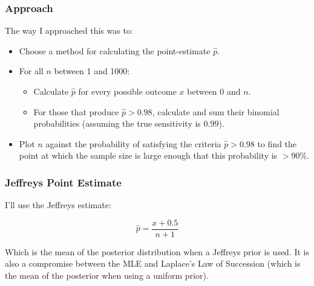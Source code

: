 \documentclass{beamer}\usepackage{knitr}
\begin{document}
\begin{frame}
\frametitle{Approach}

The way I approached this was to:
\begin{itemize}
  \item Choose a method for calculating the point-estimate $\hat{p}$. 
  \item For all $n$ between 1 and 1000:
  \begin{itemize}
    \item Calculate $\hat{p}$ for every possible outcome $x$ between $0$ and $n$.
    \item For those that produce $\hat{p} > 0.98$, calculate and sum their binomial probabilities (assuming the true sensitivity is $0.99$).
  \end{itemize}
  \item Plot $n$ against the probability of satisfying the criteria $\hat{p} > 0.98$ to find the point at which the sample size is large enough that this probability is $> 90\%$. 
\end{itemize}

\end{frame}

\begin{frame}
\frametitle{Jeffreys Point Estimate}
I'll use the Jeffreys estimate:

\begin{equation*}
  \hat{p} = \frac{x + 0.5}{n + 1}
\end{equation*}

Which is the mean of the posterior distribution when a Jeffreys prior is used. It is also a compromise between the MLE and Laplace's Law of Succession (which is the mean of the posterior when using a uniform prior).

\end{frame}

% 
% 
\end{document}
